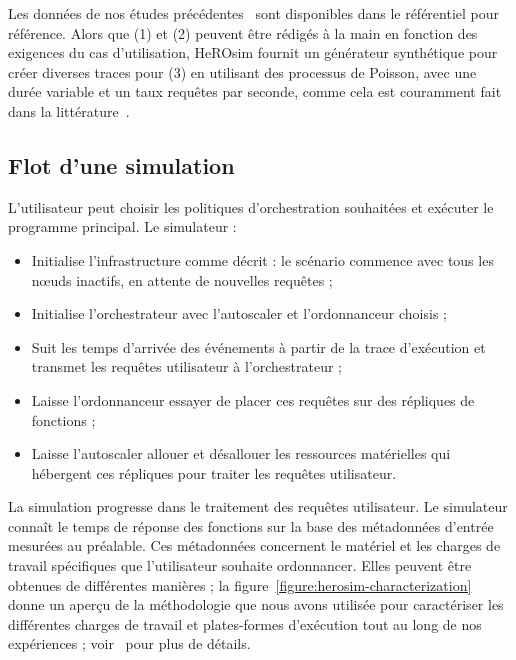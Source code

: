 Les données de nos études précédentes~\cite{herofake, herocache} sont disponibles dans le référentiel pour référence. Alors que (1) et (2) peuvent être rédigés à la main en fonction des exigences du cas d'utilisation, HeROsim fournit un générateur synthétique pour créer diverses traces pour (3) en utilisant des processus de Poisson, avec une durée variable et un taux requêtes par seconde, comme cela est couramment fait dans la littérature~\cite{herocache}. 

\subsection{Flot d'une simulation}

L'utilisateur peut choisir les politiques d'orchestration souhaitées et exécuter le programme principal. Le simulateur :

\begin{itemize}
    \item Initialise l'infrastructure comme décrit : le scénario commence avec tous les nœuds inactifs, en attente de nouvelles requêtes ;
    \item Initialise l'orchestrateur avec l'autoscaler et l'ordonnanceur choisis ;
    \item Suit les temps d'arrivée des événements à partir de la trace d'exécution et transmet les requêtes utilisateur à l'orchestrateur ;
    \item Laisse l'ordonnanceur essayer de placer ces requêtes sur des répliques de fonctions ;
    \item Laisse l'autoscaler allouer et désallouer les ressources matérielles qui hébergent ces répliques pour traiter les requêtes utilisateur.
\end{itemize}

La simulation progresse dans le traitement des requêtes utilisateur. Le simulateur connaît le temps de réponse des fonctions sur la base des métadonnées d'entrée mesurées au préalable. Ces métadonnées concernent le matériel et les charges de travail spécifiques que l'utilisateur souhaite ordonnancer. Elles peuvent être obtenues de différentes manières ; la figure~\ref{figure:herosim-characterization} donne un aperçu de la méthodologie que nous avons utilisée pour caractériser les différentes charges de travail et plates-formes d'exécution tout au long de nos expériences ; voir~\cite{herofake, herocache} pour plus de détails.

